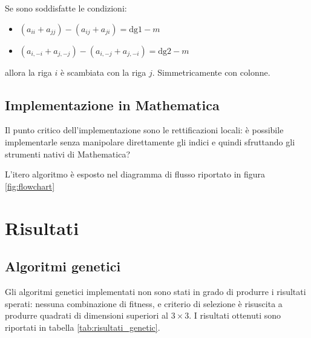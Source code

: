\documentclass[italian,twoside,twocolumn]{article}
\begin{document}
Se sono soddisfatte le condizioni:
\begin{itemize}
	\item $ \left(a_{ii} +  a_{jj} \right) - \left(a_{ij} +  a_{ji} \right) = \text{dg1} - \mathit{m}$
	\item $ \left(a_{i,-i} + a_{j,-j}\right) - \left(a_{i,-j} + a_{j,-i}\right) = \text{dg2} - \mathit{m}$
\end{itemize}
allora la riga $ i $ è scambiata con la riga $ j $. Simmetricamente con colonne.

\subsection{Implementazione in Mathematica}

Il punto critico dell'implementazione sono le rettificazioni locali: è possibile implementarle senza manipolare direttamente gli indici e quindi sfruttando gli strumenti nativi di Mathematica?

L'itero algoritmo è esposto nel diagramma di flusso riportato in figura \ref{fig:flowchart}


\section{Risultati}

\subsection{Algoritmi genetici}
Gli algoritmi genetici implementati non sono stati in grado di produrre i risultati sperati: nessuna combinazione di fitness, e criterio di selezione è risuscita a produrre quadrati di dimensioni superiori al $ 3\times 3 $. I risultati ottenuti sono riportati in tabella \ref{tab:risultati_genetic}.
\end{document}
